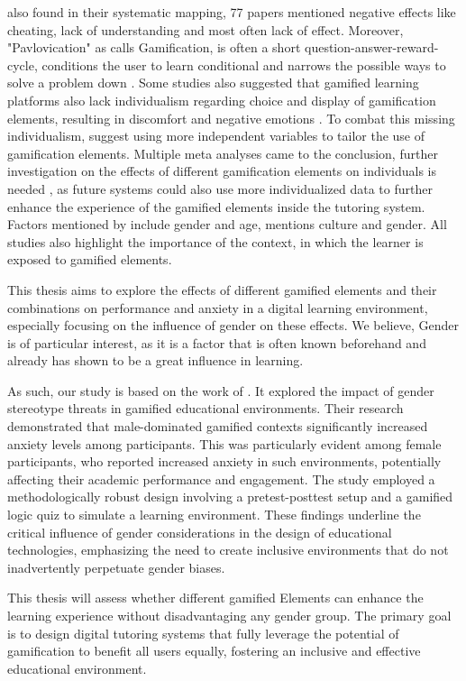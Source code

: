 \textcite{almeidaSystematicMappingNegative2021} also found in their systematic mapping, 77 papers mentioned negative effects like cheating, lack of understanding and most often lack of effect.
Moreover, "Pavlovication" as \textcite{klabbersArchitectureGameScience2018} calls Gamification, is often a short question-answer-reward-cycle, conditions the user to learn conditional and narrows the possible ways to solve a problem down \parencite{klabbersArchitectureGameScience2018}.
Some studies also suggested that gamified learning platforms also lack individualism regarding choice and display of gamification elements, resulting in discomfort and negative emotions \parencite{santosDoesGenderStereotype2023}.
To combat this missing individualism, \textcite{oliveiraTailoredGamificationEducation2023,dehghanzadehUsingGamificationSupport2024} suggest using more independent variables to tailor the use of gamification elements.
Multiple meta analyses came to the conclusion, further investigation on the effects of different gamification elements on individuals is needed \textcite{oliveiraTailoredGamificationEducation2023,dehghanzadehUsingGamificationSupport2024,hamariDoesGamificationWork2014}, as future systems could also use more individualized data to further enhance the experience of the gamified elements inside the tutoring system.
Factors mentioned by \textcite{dehghanzadehUsingGamificationSupport2024} include gender and age, \textcite{oliveiraTailoredGamificationEducation2023} mentions culture and gender. All studies also highlight the importance of the context, in which the learner is exposed to gamified elements.


This thesis aims to explore the effects of different gamified elements and their combinations on performance and anxiety in a digital learning environment, especially focusing on the influence of gender on these effects.
We believe, Gender is of particular interest, as it is a factor that is often known beforehand and already has shown to be a great influence in learning.

As such, our study is based on the work of \textcite{albuquerqueDoesGenderStereotype2017}.
It explored the impact of gender stereotype threats in gamified educational environments.
Their research demonstrated that male-dominated gamified contexts significantly increased anxiety levels among participants.
This was particularly evident among female participants, who reported increased anxiety in such environments, potentially affecting their academic performance and engagement.
The study employed a methodologically robust design involving a pretest-posttest setup and a gamified logic quiz to simulate a learning environment.
These findings underline the critical influence of gender considerations in the design of educational technologies, emphasizing the need to create inclusive environments that do not inadvertently perpetuate gender biases. 

This thesis will assess whether different gamified Elements can enhance the learning experience without disadvantaging any gender group.
The primary goal is to design digital tutoring systems that fully leverage the potential of gamification to benefit all users equally, fostering an inclusive and effective educational environment.